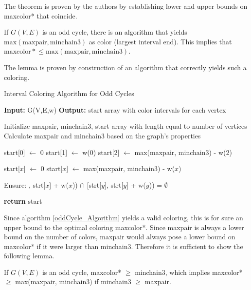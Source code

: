 \documentclass[sigconf]{acmart}
\begin{document}
The theorem is proven by the authors by establishing lower and upper bounds on
maxcolor* that coincide. 

\begin{lemma}
  If $G(V,E)$ is an odd cycle, there is an algorithm that yields $\mathrm{max(maxpair, minchain3)}$
  as color (largest interval end). This implies that $\mathrm{maxcolor*} \leq \mathrm{max(maxpair, minchain3)}$.
\end{lemma}

\noindent The lemma is proven by construction of an algorithm that correctly yields such a coloring.

\begin{algorithm}[h]
  \caption{Interval Coloring Algorithm for Odd Cycles \cite{main_paper}}
  \label{oddCycle_Algorithm}
  \begin{algorithmic}[1]
  \State \textbf{Input:} G(V,E,w)
  \State \textbf{Output:} start array with color intervals for each vertex
  
  \State Initialize maxpair, minchain3, start array with length equal to number of vertices
  \State Calculate maxpair and minchain3 based on the graph's properties
  
  \State start[0] $\gets$ 0 
  \State start[1] $\gets$ w(0) 
  \State start[2] $\gets$ max(maxpair, minchain3) - w(2) 
  
          \State start[$x$] $\gets$ 0
          \State start[$x$] $\gets$ max(maxpair, minchain3) - w($x$)
      \EndIf
  \EndFor
  
          \State Ensure:
          \State [strt[$x$], strt[$x$] + w($x$)) $\cap$ [strt[$y$], strt[$y$] + w($y$)) = $\emptyset$
      \EndFor
  \EndFor
  
  \State \textbf{return} start
  \end{algorithmic}
  \end{algorithm}

Since algorithm \ref{oddCycle_Algorithm} yields a valid coloring, this is for sure an upper bound to the optimal coloring maxcolor*.
 Since maxpair is always a lower bound on the number of colors, maxpair would always pose a lower bound
 on maxcolor* if it were larger than minchain3. Therefore it is sufficient to show the following lemma.
\begin{lemma}
If $G(V,E)$ is an odd cycle, maxcolor* $\geq$ minchain3, which implies 
maxcolor* $\geq$ max(maxpair, minchain3) if minchain3 $\geq$ maxpair.
\end{lemma}
\end{document}
